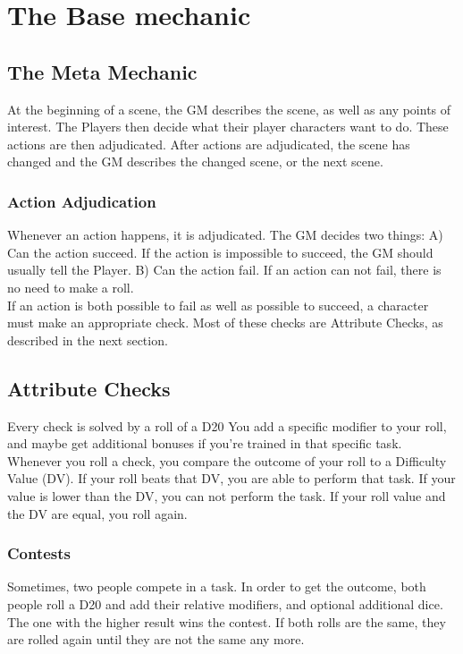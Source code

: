 \chapter{The Base mechanic}
\section{The Meta Mechanic}
At the beginning of a scene, the GM describes the scene, as well as any points of interest. The Players then decide what their player characters want to do. These actions are then adjudicated. After actions are adjudicated, the scene has changed and the GM describes the changed scene, or the next scene.

\subsection{Action Adjudication}
Whenever an action happens, it is adjudicated. The GM decides two things: A) Can the action succeed. If the action is impossible to succeed, the GM should usually tell the Player. B) Can the action fail. If an action can not fail, there is no need to make a roll.\\
If an action is both possible to fail as well as possible to succeed, a character must make an appropriate check. Most of these checks are Attribute Checks, as described in the next section.\\

\section{Attribute Checks}
Every check is solved by a roll of a D20 You add a specific modifier to your roll, and maybe get additional bonuses if you're trained in that specific task. Whenever you roll a check, you compare the outcome of your roll to a Difficulty Value (DV). If your roll beats that DV, you are able to perform that task. If your value is lower than the DV, you can not perform the task. If your roll value and the DV are equal, you roll again.

\subsection{Contests}
Sometimes, two people compete in a task. In order to get the outcome, both people roll a D20 and add their relative modifiers, and optional additional dice. The one with the higher result wins the contest. If both rolls are the same, they are rolled again until they are not the same any more.


